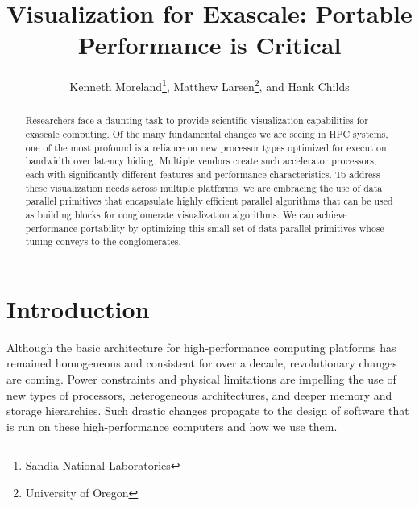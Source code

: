 \documentclass{superfri}
\begin{document}
\author{
  Kenneth Moreland\footnote{Sandia National Laboratories},
  Matthew Larsen\footnote{\label{ou}University of Oregon}, and
  Hank Childs
  }

\title{Visualization for Exascale: Portable Performance is Critical}

\maketitle{}

\begin{abstract}%
  \noindent
  Researchers face a daunting task to provide scientific visualization
  capabilities for exascale computing. Of the many fundamental changes we
  are seeing in HPC systems, one of the most profound is a reliance on new
  processor types optimized for execution bandwidth over latency hiding.
  Multiple vendors create such accelerator processors, each with
  significantly different features and performance characteristics. To
  address these visualization needs across multiple platforms, we are
  embracing the use of data parallel primitives that encapsulate highly
  efficient parallel algorithms that can be used as building blocks for
  conglomerate visualization algorithms. We can achieve performance
  portability by optimizing this small set of data parallel primitives
  whose tuning conveys to the conglomerates.

\end{abstract}


\section*{Introduction}
\label{sec:Introduction}

\noindent
Although the basic architecture for high-performance computing platforms has
remained homogeneous and consistent for over a decade, revolutionary changes
are coming. Power constraints and physical limitations are impelling the
use of new types of processors, heterogeneous architectures, and deeper
memory and storage hierarchies. Such drastic changes propagate to the
design of software that is run on these high-performance computers and how
we use them.
\end{document}
